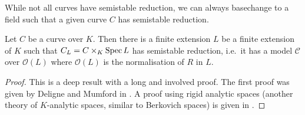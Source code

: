 While not all curves have semistable reduction, we can always basechange to a field such that a given curve  $C$ has semistable reduction. 

\begin{theorem}
	Let $C$ be a curve over $K$. 
	Then there is a finite extension $L$ be a finite extension of $K$ such that $C_L  = C \times _K \operatorname{Spec} L$ has semistable reduction, i.e.\
	it has a model $\mathscr C$ over $\mathcal{O}(L)$ where $\mathcal{O}(L)$ is the normalisation of $R$ in $L$. 
\end{theorem}
\begin{proof}
	This is a deep result with a long and involved proof. 
	The first proof was given by Deligne and Mumford in \cite{deligneIrreducibilitySpaceCurves1969}. 
	A proof using rigid analytic spaces (another theory of $K$-analytic spaces, similar to Berkovich spaces) is given in \cite{arzdorfAnotherProofSemistable2012}.
\end{proof}
